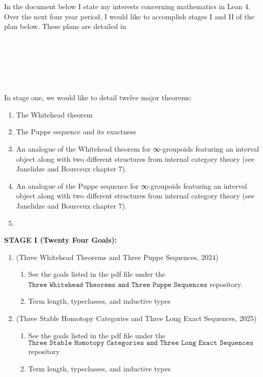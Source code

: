 \documentclass{book}
\newcounter{pcounter}
\newcounter{sectioncount}
\newcounter{subsectioncount}
\renewcommand{\section}[1]{\newpage\ \\ \ \\ \begin{center} \scalebox{1.5}{\texttt{\thesectioncount . #1}} \stepcounter{sectioncount} \setcounter{subsectioncount}{1} \end{center} \begin{center} \ \\ \ \\ \thispagestyle{empty} \end{center}}
\begin{document}
In the document below I state my interests concerning mathematics in Lean 4. Over the next four year period, I would like to accomplish stages I and II of the plan below. These plans are detailed in 

\section{\scalebox{0.6}{Stage I: goals concerning homotopy and stable homotopy}}

In stage one, we would like to detail twelve major theorems:

\begin{enumerate}
\item The Whitehead theorem
\item The Puppe sequence and its exactness
\item An analogue of the Whitehead theorem for ∞-groupoids featuring an interval object along with two different structures from internal category theory (see Janelidze and Bourceux chapter 7).
\item An analogue of the Puppe sequence for ∞-groupoids featuring an interval object along with two different structures from internal category theory (see Janelidze and Bourceux chapter 7).
\item 
\end{enumerate}

{\bf STAGE I (Twenty Four Goals):}
\begin{enumerate}
\item (Three Whitehead Theorems and Three Puppe Sequences, 2024)
\begin{enumerate}
\item See the goals listed in the pdf file under the $\texttt{Three Whitehead Theorems and Three Puppe Sequences}$ repository.
\item Term length, typeclasses, and inductive types
\end{enumerate}
\item (Three Stable Homotopy Categories and Three Long Exact Sequences, 2025)
\begin{enumerate}
\item See the goals listed in the pdf file under the $\texttt{Three Stable Homotopy Categories and Three Long Exact Sequences}$ repository 
\item Term length, typeclasses, and inductive types
\end{enumerate}
\end{enumerate}
\end{document}
